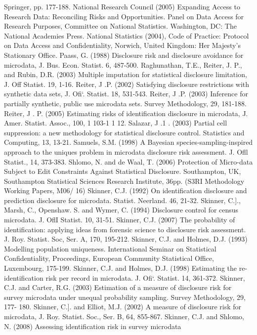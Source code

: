Springer, pp. 177-188.
National Research Council (2005) Expanding Access to Research Data: Reconciling
Risks and Opportunities. Panel on Data Access for Research Purposes, Committee on
National Statistics. Washington, DC: The National Academies Press.
National Statistics (2004), Code of Practice: Protocol on Data Access and
Conﬁdentiality, Norwich, United Kingdom: Her Majesty’s Stationary Office.
Paass, G. (1988) Disclosure risk and disclosure avoidance for microdata, J. Bus. Econ.
Statist. 6, 487-500.
Raghunathan, T.E., Reiter, J. P., and Rubin, D.R. (2003) Multiple imputation for
statistical disclosure limitation, J. Off Statist. 19, 1-16.
Reiter, J .P. (2002) Satisfying disclosure restrictions with synthetic data sets, J. Oﬁ‘.
Statist. 18, 531-543.
Reiter, J .P. (2003) Inference for partially synthetic, public use microdata sets. Survey
Methodology, 29, 181-188.
Reiter, J . P. (2005) Estimating risks of identification disclosure in microdata, J. Amer.
Statist. Assoc., 100, 1 103-1 1 12.
Salazar, J .1 . (2003) Partial cell suppression: a new methodology for statistical disclosure
control. Statistics and Computing, 13, 13-21.
Samuels, S.M. (1998) A Bayesian species-sampling-inspired approach to the uniques
problem in microdata disclosure risk assessment. J. Oﬂl Statist., 14, 373-383.
Shlomo, N. and de Waal, T. (2006) Protection of Micro-data Subject to Edit Constraints
Against Statistical Disclosure. Southampton, UK, Southampton Statistical Sciences
Research Institute, 36pp. (S3RI Methodology Working Papers, M06/ 16)
Skinner, C.J. (1992) On identification disclosure and prediction disclosure for microdata.
Statist. Neerland. 46, 21-32.
Skinner, C.]., Marsh, C., Openshaw. S. and Wymer, C. (1994) Disclosure control for
census microdata. J. OﬂI Statist. 10, 31-51.
Skinner, C.J. (2007) The probability of identification: applying ideas from forensic
science to disclosure risk assessment. J. Roy. Statist. Soc, Ser. A, 170, 195-212.
Skinner, C.J. and Holmes, D.J. (1993) Modelling population uniqueness. International
Seminar on Statistical Conﬁdentiality, Proceedings, European Community Statistical
Office, Luxembourg, 175-199.
Skinner, C.J. and Holmes, D.J. (1998) Estimating the re-identification risk per record in
microdata. J. Oﬁ‘. Statist. 14, 361-372.
Skinner, C.J. and Carter, R.G. (2003) Estimation of a measure of disclosure risk for
survey microdata under unequal probability sampling. Survey Methodology, 29, 177-
180.
Skinner, C.]. and Elliot, M.J. (2002) A measure of disclosure risk for microdata, J. Roy.
Statist. Soc., Ser. B, 64, 855-867.
Skinner, C.J. and Shlomo, N. (2008) Assessing identification risk in survey microdata
